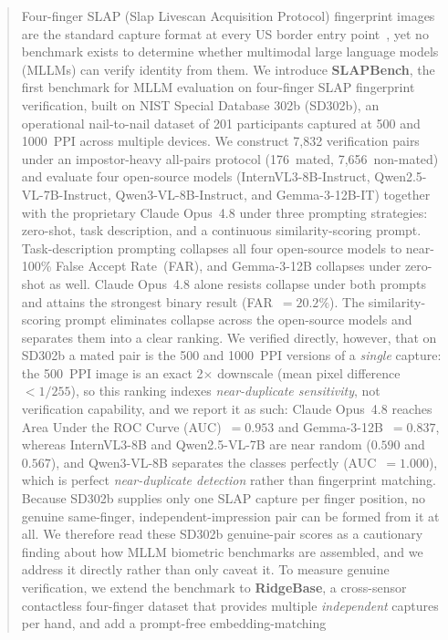 \documentclass[journal]{IEEEtran}
\begin{document}
\begin{abstract}
Four-finger SLAP (Slap Livescan Acquisition Protocol) fingerprint images
are the standard capture format at every US border entry
point~\cite{nist_sd302}, yet no benchmark exists to determine whether
multimodal large language models (MLLMs) can verify identity from them.
%
We introduce \textbf{SLAPBench}, the first benchmark for MLLM evaluation
on four-finger SLAP fingerprint verification, built on NIST Special
Database 302b (SD302b), an operational nail-to-nail dataset of 201
participants captured at 500 and 1000~PPI across multiple devices.
%
We construct 7,832 verification pairs under an impostor-heavy all-pairs
protocol (176~mated, 7,656~non-mated) and evaluate four open-source
models (InternVL3-8B-Instruct, Qwen2.5-VL-7B-Instruct,
Qwen3-VL-8B-Instruct, and Gemma-3-12B-IT) together with the proprietary
Claude Opus~4.8 under three prompting strategies: zero-shot, task
description, and a continuous similarity-scoring prompt.
%
Task-description prompting collapses all four open-source models to
near-100\% False Accept Rate~(FAR), and Gemma-3-12B collapses under
zero-shot as well. Claude Opus~4.8 alone resists collapse under both
prompts and attains the strongest binary result (FAR~$= 20.2\%$).
%
The similarity-scoring prompt eliminates collapse across the open-source
models and separates them into a clear ranking. We verified directly, however,
that on SD302b a mated pair is the 500 and 1000~PPI versions of a
\emph{single} capture: the 500~PPI image is an exact 2$\times$ downscale
(mean pixel difference $<1/255$), so this ranking indexes
\emph{near-duplicate sensitivity}, not verification capability, and we report
it as such: Claude Opus~4.8 reaches Area Under the ROC Curve (AUC)~$= 0.953$
and Gemma-3-12B~$= 0.837$, whereas InternVL3-8B and Qwen2.5-VL-7B are near
random ($0.590$ and $0.567$), and Qwen3-VL-8B separates the classes perfectly
(AUC~$= 1.000$), which is perfect \emph{near-duplicate detection} rather than
fingerprint matching. Because SD302b supplies only one SLAP capture per finger
position, no genuine same-finger, independent-impression pair can be formed
from it at all. We therefore read these SD302b genuine-pair scores as a
cautionary finding about how MLLM biometric benchmarks are assembled, and we
address it directly rather than only caveat it.
%
To measure genuine verification, we extend the benchmark to \textbf{RidgeBase}, a
cross-sensor contactless four-finger dataset that provides multiple
\emph{independent} captures per hand, and add a prompt-free embedding-matching

\end{abstract}
\end{document}
